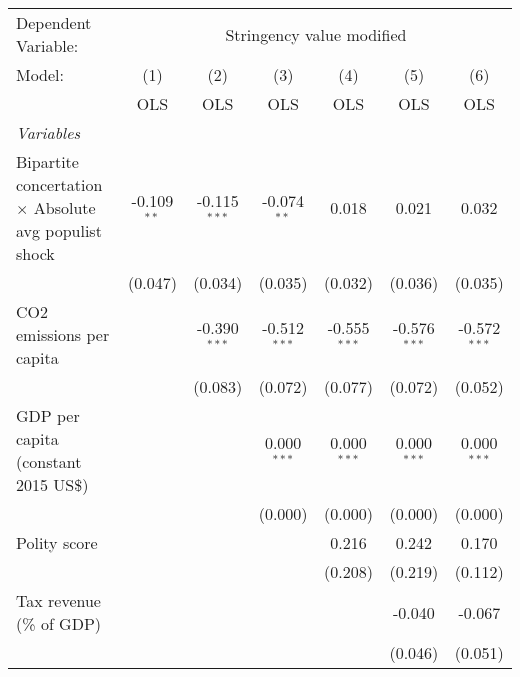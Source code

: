 
\begingroup
\centering
\begin{tabular}{lcccccc}
   \toprule
   Dependent Variable: & \multicolumn{6}{c}{Stringency value modified}\\
   Model:                                                       & (1)           & (2)            & (3)            & (4)            & (5)            & (6)\\  
                                                                &  OLS          & OLS            & OLS            & OLS            & OLS            & OLS\\  
   \midrule
   \emph{Variables}\\
   Bipartite concertation $\times$ Absolute avg populist shock  & -0.109$^{**}$ & -0.115$^{***}$ & -0.074$^{**}$  & 0.018          & 0.021          & 0.032\\   
                                                                & (0.047)       & (0.034)        & (0.035)        & (0.032)        & (0.036)        & (0.035)\\   
   CO2 emissions per capita                                     &               & -0.390$^{***}$ & -0.512$^{***}$ & -0.555$^{***}$ & -0.576$^{***}$ & -0.572$^{***}$\\   
                                                                &               & (0.083)        & (0.072)        & (0.077)        & (0.072)        & (0.052)\\   
   GDP per capita (constant 2015 US\$)                          &               &                & 0.000$^{***}$  & 0.000$^{***}$  & 0.000$^{***}$  & 0.000$^{***}$\\   
                                                                &               &                & (0.000)        & (0.000)        & (0.000)        & (0.000)\\   
   Polity score                                                 &               &                &                & 0.216          & 0.242          & 0.170\\   
                                                                &               &                &                & (0.208)        & (0.219)        & (0.112)\\   
   Tax revenue (\% of GDP)                                      &               &                &                &                & -0.040         & -0.067\\   
                                                                &               &                &                &                & (0.046)        & (0.051)\\   

\end{tabular}
